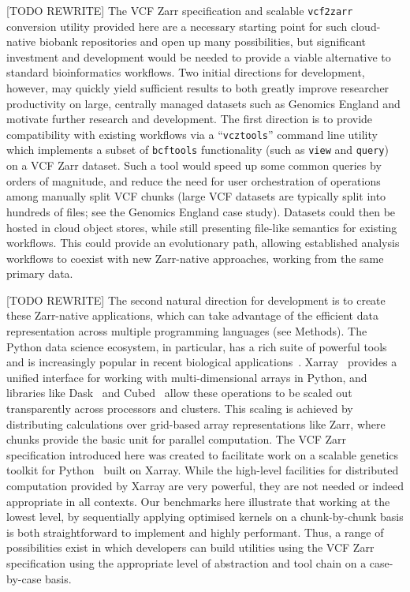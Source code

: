 \documentclass[a4paper,num-refs]{oup-contemporary}
\begin{document}
[TODO REWRITE]
The VCF Zarr specification and scalable \texttt{vcf2zarr} conversion utility
provided here are a necessary starting point for such cloud-native
biobank repositories and open up many possibilities,
but significant investment and development would be needed
to provide a viable alternative to standard bioinformatics workflows.
Two initial directions for development, however, may quickly
yield sufficient results to both greatly improve researcher productivity on
large, centrally managed datasets such as Genomics England
and motivate further research and development.
The first direction is to provide compatibility with existing
workflows via a ``\texttt{vcztools}'' command line utility which
implements a subset of \texttt{bcftools} functionality (such as
\texttt{view} and \texttt{query}) on a VCF Zarr dataset.
Such a tool would speed up some common queries by orders
of magnitude, and reduce the need for user orchestration of
operations among manually split VCF chunks (large VCF datasets
are typically split into hundreds of files; see the Genomics
England case study). Datasets could then be hosted in cloud
object stores, while still presenting file-like semantics
for existing workflows. This could provide an evolutionary path,
allowing established analysis workflows to coexist with new Zarr-native
approaches, working from the same primary data.

[TODO REWRITE]
The second natural direction for development is to create
these Zarr-native applications, which can take advantage
of the efficient data representation
across multiple programming languages (see Methods).
The Python data science ecosystem, in particular,
has a rich suite of powerful tools~\cite[e.g.][]{
mckinney2010data,
lam2015numba,
kluyver2016jupyter,
harris2020array,
virtanen2020scipy}
and is increasingly
popular in recent biological applications~\citep[e.g.][]{
abdennur2020cooler,
rand2022bionumpy,
open2c2024bioframe,
hou2024admix}.
Xarray~\cite{hoyer2017xarray} provides a unified interface for working
with multi-dimensional arrays
in Python, and libraries like Dask~\cite{rocklin2015dask}
and Cubed~\cite{cubed2024} allow these operations to be
scaled out transparently across processors and clusters.
This scaling is achieved by distributing calculations over
grid-based array representations like Zarr, where chunks
provide the basic unit for parallel computation.
The VCF Zarr specification introduced here was created
to facilitate work on a scalable genetics toolkit for
Python~\cite{sgkit2024} built on Xarray.
While the high-level facilities for distributed
computation provided by Xarray
are very powerful, they are not needed or indeed
appropriate in all contexts. Our benchmarks here
illustrate that working at the lowest level,
by sequentially applying optimised kernels on a chunk-by-chunk
basis is both straightforward to implement and highly performant.
Thus, a range of possibilities exist in which developers
can build utilities using the VCF Zarr specification
using the appropriate level of abstraction and tool chain
on a case-by-case basis.
\end{document}
